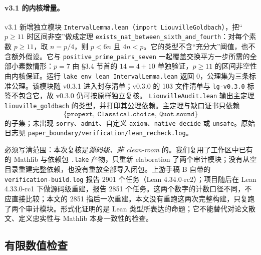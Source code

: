 \documentclass[11pt,a4paper]{ctexart}
\theoremstyle{plain}
\theoremstyle{definition}
\newcommand{\code}[1]{\texttt{#1}}
\begin{document}
\paragraph{v3.1 的内核增量。}v3.1 新增独立模块 \code{IntervalLemma.lean}（\code{import LiouvilleGoldbach}），把“$p\ge11$ 时区间非空”做成定理 \code{exists\_nat\_between\_sixth\_and\_fourth}：对每个素数 $p\ge11$，取 $n=p/4$，则 $p<6n$ 且 $4n<p$。它的类型不含“充分大”阈值，也不含额外假设。它与 \code{positive\_prime\_pairs\_seven} 一起覆盖交换平方一步所需的全部小素数情形：$p=7$ 由 §3.4 节首的 $14=4+10$ 单独验证，$p\ge11$ 的区间非空性由内核保证。运行 \code{lake env lean IntervalLemma.lean} 返回 0，公理集为三条标准公理。该模块随 v0.3.1 进入封存清单；v0.3.0 的 103 文件清单与 \code{lg-v0.3.0} 标签不包含它，故 v0.3.0 仍可按原样独立复核。
\code{LiouvilleAudit.lean} 输出主定理 \code{liouville\_goldbach} 的类型，并打印其公理依赖。主定理与缺口证书只依赖
\[
  \{\code{propext},\ \code{Classical.choice},\ \code{Quot.sound}\}
\]
的子集；未出现 \code{sorry}、\code{admit}、自定义 \code{axiom}、\code{native\_decide} 或 \code{unsafe}。原始日志见 \code{paper\_boundary/verification/lean\_recheck.log}。

必须写清范围：本次复核是\emph{源码级、非 clean-room} 的。我们复用了工作区中已有的 Mathlib 与依赖包 \code{.lake} 产物，只重新 elaboration 了两个审计模块；没有从空目录重建完整依赖，也没有重放全部导入闭包。上游手稿 B 自带的 \code{verification-build.log} 报告 2901 个任务（Lean 4.34.0-rc2）；项目随后在 Lean 4.33.0-rc1 下做源码级重建，报告 2851 个任务。这两个数字的计数口径不同，不应直接比较；本文的 2851 指后一次重建。本文没有重跑这两次完整构建，只复跑了两个审计模块。形式化证明的是 Lean 类型所表达的命题；它不能替代对论文散文、定义忠实性与 Mathlib 本身一致性的检查。

\subsection{有限数值检查}
\label{sec:numerical}
\end{document}
